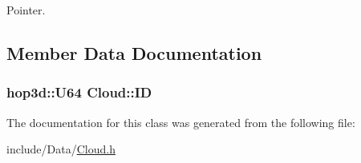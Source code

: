 Pointer. 



\subsection{Member Data Documentation}
\hypertarget{class_cloud_aa89d2de77505b1a09032fe8317d7703c}{
\subsubsection[{I\-D}]{\setlength{\rightskip}{0pt plus 5cm}hop3d\-::\-U64 Cloud\-::\-I\-D}}\label{class_cloud_aa89d2de77505b1a09032fe8317d7703c}


The documentation for this class was generated from the following file\-:\begin{DoxyCompactItemize}
\item 
include/\-Data/\hyperlink{_cloud_8h}{Cloud.\-h}\end{DoxyCompactItemize}

